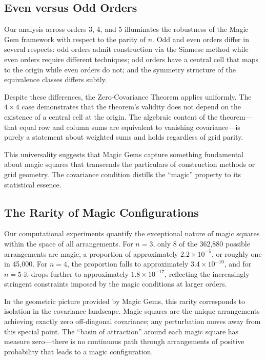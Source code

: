 \subsection{Even versus Odd Orders}

Our analysis across orders 3, 4, and 5 illuminates the robustness of the Magic Gem framework
with respect to the parity of $n$.
Odd and even orders differ in several respects:
odd orders admit construction via the Siamese method while even orders require different techniques;
odd orders have a central cell that maps to the origin while even orders do not;
and the symmetry structure of the equivalence classes differs subtly.

Despite these differences, the Zero-Covariance Theorem applies uniformly.
The $4 \times 4$ case demonstrates that the theorem's validity does not depend on
the existence of a central cell at the origin.
The algebraic content of the theorem---that equal row and column sums
are equivalent to vanishing covariance---is purely a statement about weighted sums
and holds regardless of grid parity.

This universality suggests that Magic Gems capture something fundamental about magic squares
that transcends the particulars of construction methods or grid geometry.
The covariance condition distills the ``magic'' property to its statistical essence.

\subsection{The Rarity of Magic Configurations}

Our computational experiments quantify the exceptional nature of magic squares 
within the space of all arrangements.
For $n = 3$, only 8 of the 362,880 possible arrangements are magic,
a proportion of approximately $2.2 \times 10^{-5}$, or roughly one in 45,000.
For $n = 4$, the proportion falls to approximately $3.4 \times 10^{-10}$,
and for $n = 5$ it drops further to approximately $1.8 \times 10^{-17}$,
reflecting the increasingly stringent constraints imposed by the magic conditions at larger orders.

In the geometric picture provided by Magic Gems, this rarity corresponds to isolation in the covariance landscape.
Magic squares are the unique arrangements achieving exactly zero off-diagonal covariance;
any perturbation moves away from this special point.
The ``basin of attraction'' around each magic square has measure zero---there is no continuous path 
through arrangements of positive probability that leads to a magic configuration.


